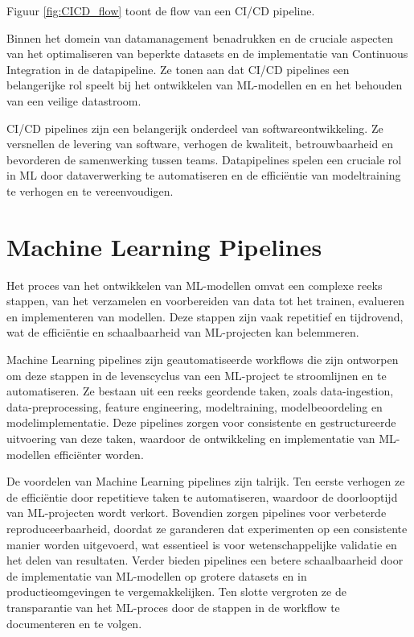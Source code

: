 Figuur \ref{fig:CICD_flow} toont de flow van een CI/CD pipeline.

Binnen het domein van datamanagement benadrukken \textcite{Samad2018} en \textcite{Vadavalasa2020} de cruciale aspecten van het optimaliseren van beperkte datasets en de implementatie van Continuous Integration in de datapipeline. Ze tonen aan dat CI/CD pipelines een belangerijke rol speelt bij het ontwikkelen van ML-modellen en en het behouden van een veilige datastroom.

CI/CD pipelines zijn een belangerijk onderdeel van softwareontwikkeling. Ze versnellen de levering van software, verhogen de kwaliteit, betrouwbaarheid en bevorderen de samenwerking tussen teams. Datapipelines spelen een cruciale rol in ML door dataverwerking te automatiseren en de efficiëntie van modeltraining te verhogen en te vereenvoudigen.
\section{Machine Learning Pipelines}

Het proces van het ontwikkelen van ML-modellen omvat een complexe reeks stappen, van het verzamelen en voorbereiden van data tot het trainen, evalueren en implementeren van modellen. Deze stappen zijn vaak repetitief en tijdrovend, wat de efficiëntie en schaalbaarheid van ML-projecten kan belemmeren.

Machine Learning pipelines zijn geautomatiseerde workflows die zijn ontworpen om deze stappen in de levenscyclus van een ML-project te stroomlijnen en te automatiseren. Ze bestaan uit een reeks geordende taken, zoals data-ingestion, data-preprocessing, feature engineering, modeltraining, modelbeoordeling en modelimplementatie. Deze pipelines zorgen voor consistente en gestructureerde uitvoering van deze taken, waardoor de ontwikkeling en implementatie van ML-modellen efficiënter worden.

De voordelen van Machine Learning pipelines zijn talrijk. Ten eerste verhogen ze de efficiëntie door repetitieve taken te automatiseren, waardoor de doorlooptijd van ML-projecten wordt verkort. Bovendien zorgen pipelines voor verbeterde reproduceerbaarheid, doordat ze garanderen dat experimenten op een consistente manier worden uitgevoerd, wat essentieel is voor wetenschappelijke validatie en het delen van resultaten. Verder bieden pipelines een betere schaalbaarheid door de implementatie van ML-modellen op grotere datasets en in productieomgevingen te vergemakkelijken. Ten slotte vergroten ze de transparantie van het ML-proces door de stappen in de workflow te documenteren en te volgen.

